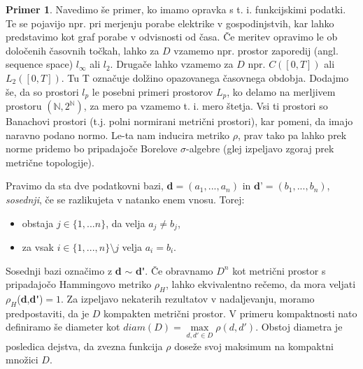 \documentclass[12pt,a4paper]{amsart}
\theoremstyle{definition} %
\newtheorem{primer}[definicija]{Primer}
\theoremstyle{plain} %
\begin{document}
\begin{primer}
Navedimo še primer, ko imamo opravka s t. i. funkcijskimi podatki. Te se pojavijo npr. pri merjenju porabe elektrike v gospodinjstvih, kar lahko predstavimo kot graf porabe v odvisnosti od časa. Če meritev opravimo le ob določenih časovnih točkah, lahko za $D$ vzamemo npr. prostor zaporedij (angl. sequence space) $l_{\infty}$ ali $l_{2}$. Drugače lahko vzamemo za $D$ npr. $C([0,T])$ ali $L_{2}([0,T])$. Tu T označuje dolžino opazovanega časovnega obdobja. Dodajmo še, da so prostori $l_p$ le posebni primeri prostorov $L_p$, ko delamo na merljivem prostoru $(\mathbb{N}, 2^\mathbb{N})$, za mero pa vzamemo t. i. mero štetja. Vsi ti prostori so Banachovi prostori (t.j. polni normirani metrični prostori), kar pomeni, da imajo naravno podano normo. Le-ta nam inducira metriko $\rho$, prav tako pa lahko prek norme pridemo bo pripadajoče Borelove $\sigma$-algebre (glej izpeljavo zgoraj prek metrične topologije). 
\end{primer}
\newline
\newline
Pravimo da sta dve podatkovni bazi, \textbf{d}$= (a_{1},...,a_{n})$ in $\textbf{d'}= (b_{1},...,b_{n})$,  \textit{sosednji}, če se razlikujeta v natanko enem vnosu. Torej:
\begin{itemize}
\item obstaja $j\in\{1,...n\}$, da velja $a_{j} \neq b_{j}$,
\item za vsak $i\in\{1,...,n\} \setminus j$ velja $a_{i} = b_{i}$.
\end{itemize}
Sosednji bazi označimo z \textbf{d} $\sim$ \textbf{d\'}. Če obravnamo $D^n$ kot metrični prostor s pripadajočo Hammingovo metriko $\rho_{H}$, lahko ekvivalentno rečemo, da mora veljati $\rho_{H}$(\textbf{d},\textbf{d\'})$=1$.
\newline
\newline
Za izpeljavo nekaterih rezultatov v nadaljevanju, moramo predpostaviti, da je $D$ kompakten metrični prostor. V primeru kompaktnosti nato definiramo še diameter kot $diam(D) = \max\limits_{d,d' \in D}\rho(d,d')$. Obstoj diametra je posledica dejstva, da zvezna funkcija $\rho$ doseže svoj maksimum na kompaktni množici $D$.
\end{document}
